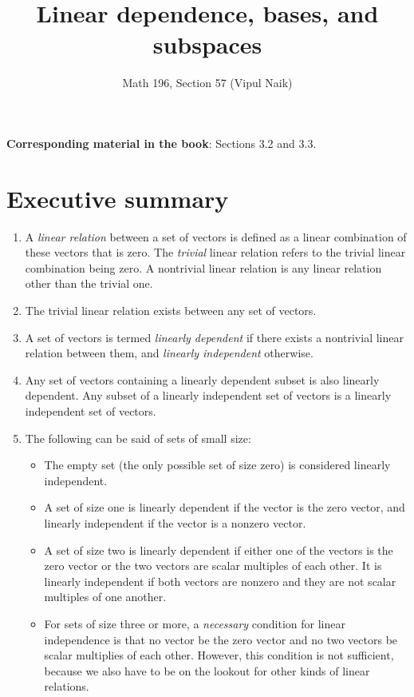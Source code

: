 \documentclass[10pt]{amsart}
\title{Linear dependence, bases, and subspaces}
\author{Math 196, Section 57 (Vipul Naik)}
\begin{document}
\maketitle

{\bf Corresponding material in the book}: Sections 3.2 and 3.3.

\section*{Executive summary}
\begin{enumerate}
\item A {\em linear relation} between a set of vectors is defined as a
  linear combination of these vectors that is zero. The {\em trivial}
  linear relation refers to the trivial linear combination being
  zero. A nontrivial linear relation is any linear relation other than
  the trivial one.
\item The trivial linear relation exists between any set of vectors.
\item A set of vectors is termed {\em linearly dependent} if there
  exists a nontrivial linear relation between them, and {\em linearly
    independent} otherwise.
\item Any set of vectors containing a linearly dependent subset is
  also linearly dependent. Any subset of a linearly independent set of
  vectors is a linearly independent set of vectors.
\item The following can be said of sets of small size:
  \begin{itemize}
  \item The empty set (the only possible set of size zero) is
    considered linearly independent.
  \item A set of size one is linearly dependent if the vector is the
    zero vector, and linearly independent if the vector is a nonzero
    vector.
  \item A set of size two is linearly dependent if either one of the
    vectors is the zero vector or the two vectors are scalar multiples
    of each other. It is linearly independent if both vectors are
    nonzero and they are not scalar multiples of one another.
  \item For sets of size three or more, a {\em necessary} condition
    for linear independence is that no vector be the zero vector and
    no two vectors be scalar multiplies of each other. However, this
    condition is not sufficient, because we also have to be on the
    lookout for other kinds of linear relations.
  \end{itemize}

\end{enumerate}
\end{document}
